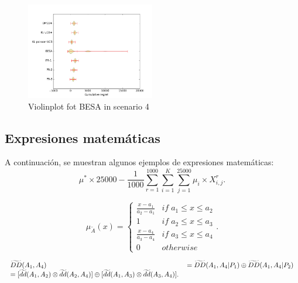 {{\begin{figure}
\centering
\includegraphics[width=0.5\textwidth]{recursos/Figure2}
\caption{Violinplot fot BESA in scenario 4}
\label{fig:violin_besa_escenario4}
\end{figure}



\subsection{Expresiones matemáticas}
A continuación, se muestran algunos ejemplos de expresiones matemáticas:
\begin{equation}
\mu^*\times 25000-\frac{1}{1000}\sum_{r=1}^{1000}\sum_{i=1}^{K}\sum_{j=1}^{25000}\mu_i\times X_{i,j}^r.
\end{equation}

\begin{equation}
\mu_{\widetilde{A}}(x)=\left\{ \begin{array}{cc}
\frac{x-a_{1}}{a_{2}-a_{1}} & if\; a_{1}\leq x\leq a_{2}\\
1 & if\; a_{2}\leq x\leq a_{3}\\
\frac{x-a_{4}}{a_{3}-a_{4}} & if\; a_{3}\leq x\leq a_{4}\\
0 & otherwise
\end{array}\right. .
\end{equation}


\begin{equation}
\begin{tabular}{ll}
$\widetilde{DD}(A_{1},A_{4})$ & $=\widetilde{DD}(A_{1},A_{4}|P_{1})\oplus
\widetilde{DD}(A_{1},A_{4}|P_{2})$ \\
$=[\widetilde{dd}(A_{1},A_{2})\otimes \widetilde{dd}(A_{2},A_{4})]\oplus \lbrack \widetilde{dd}(A_{1},A_{3})\otimes \widetilde{%
dd}(A_{3},A_{4})].$%
\end{tabular}%
\end{equation}



}}
